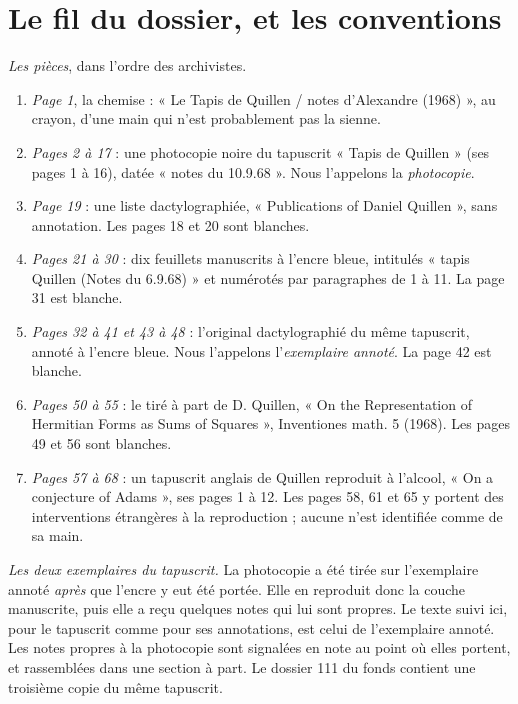 \documentclass[11pt,a4paper]{article}
\begin{document}
\section*{Le fil du dossier, et les conventions}

\emph{Les pièces}, dans l'ordre des archivistes.

\begin{enumerate}
  \item \emph{Page 1}, la chemise : « Le Tapis de Quillen / notes d'Alexandre
  (1968) », au crayon, d'une main qui n'est probablement pas la sienne.
  \item \emph{Pages 2 à 17} : une photocopie noire du tapuscrit « Tapis de
  Quillen » (ses pages 1 à 16), datée « notes du 10.9.68 ». Nous l'appelons la
  \emph{photocopie}.
  \item \emph{Page 19} : une liste dactylographiée, « Publications of Daniel
  Quillen », sans annotation. Les pages 18 et 20 sont blanches.
  \item \emph{Pages 21 à 30} : dix feuillets manuscrits à l'encre bleue,
  intitulés « tapis Quillen (Notes du 6.9.68) » et numérotés par paragraphes
  de 1 à 11. La page 31 est blanche.
  \item \emph{Pages 32 à 41 et 43 à 48} : l'original dactylographié du même
  tapuscrit, annoté à l'encre bleue. Nous l'appelons l'\emph{exemplaire annoté}.
  La page 42 est blanche.
  \item \emph{Pages 50 à 55} : le tiré à part de D. Quillen, « On the
  Representation of Hermitian Forms as Sums of Squares », Inventiones math. 5
  (1968). Les pages 49 et 56 sont blanches.
  \item \emph{Pages 57 à 68} : un tapuscrit anglais de Quillen reproduit à
  l'alcool, « On a conjecture of Adams », ses pages 1 à 12. Les pages 58, 61
  et 65 y portent des interventions étrangères à la reproduction ; aucune
  n'est identifiée comme de sa main.
\end{enumerate}

\emph{Les deux exemplaires du tapuscrit.} La photocopie a été tirée sur
l'exemplaire annoté \emph{après} que l'encre y eut été portée. Elle en reproduit
donc la couche manuscrite, puis elle a reçu quelques notes qui lui sont propres.
Le texte suivi ici, pour le tapuscrit comme pour ses annotations, est celui de
l'exemplaire annoté. Les notes propres à la photocopie sont signalées en note au
point où elles portent, et rassemblées dans une section à part. Le dossier 111
du fonds contient une troisième copie du même tapuscrit.
\end{document}
